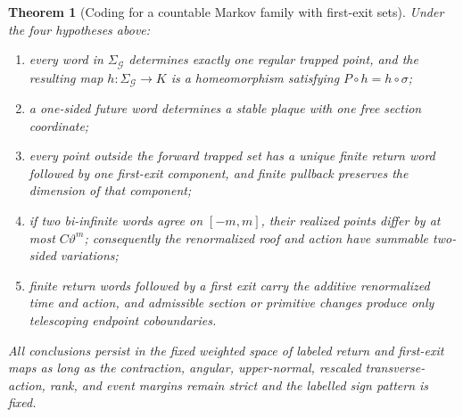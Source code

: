 \documentclass[11pt]{amsart}
\numberwithin{equation}{section}
\newtheorem{theorem}{Theorem}[section]
\theoremstyle{definition}
\theoremstyle{remark}
\newcommand{\cG}{\mathcal G}
\begin{document}
\begin{theorem}[Coding for a countable Markov family with first-exit sets]
\label{thm:terminal-extension}
Under the four hypotheses above:
\begin{enumerate}
\renewcommand{\labelenumi}{\textup{(\roman{enumi})}}
\item every word in $\Sigma_{\cG}$ determines exactly one regular trapped
point, and the resulting map $h:\Sigma_{\cG}\to K$ is a homeomorphism
satisfying $P\circ h=h\circ\sigma$;
\item a one-sided future word determines a stable plaque with one free
section coordinate;
\item every point outside the forward trapped set has a unique finite
return word followed by one first-exit component, and finite pullback
preserves the dimension of that component;
\item if two bi-infinite words agree on $[-m,m]$, their realized points
differ by at most $C\vartheta^m$; consequently the renormalized roof and
action have summable two-sided variations;
\item finite return words followed by a first exit carry the additive renormalized time and
action, and admissible section or primitive changes produce only
telescoping endpoint coboundaries.
\end{enumerate}
All conclusions persist in the fixed weighted space of labeled return and
first-exit maps as
long as the contraction, angular, upper-normal, rescaled transverse-action,
rank, and event margins remain strict and the labelled sign pattern is
fixed.
\end{theorem}
\end{document}
